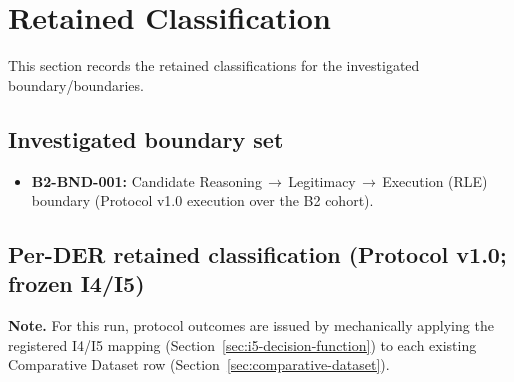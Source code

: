 \section{Retained Classification}
\label{sec:retained-classification}
This section records the retained classifications for the investigated boundary/boundaries.

\subsection{Investigated boundary set}
\begin{itemize}
  \item \textbf{B2-BND-001:} Candidate Reasoning\,$\rightarrow$\,Legitimacy\,$\rightarrow$\,Execution (RLE) boundary (Protocol v1.0 execution over the B2 cohort).
\end{itemize}

\subsection{Per-DER retained classification (Protocol v1.0; frozen I4/I5)}
\textbf{Note.} For this run, protocol outcomes are issued by mechanically applying the registered I4/I5 mapping (Section~\ref{sec:i5-decision-function}) to each existing Comparative Dataset row (Section~\ref{sec:comparative-dataset}).


